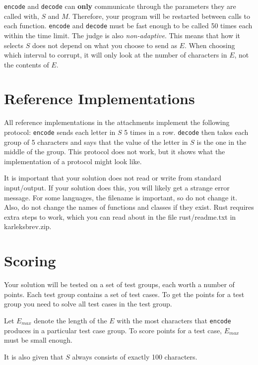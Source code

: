 \texttt{encode} and \texttt{decode} can \textbf{only} communicate through the parameters they are called with, 
$S$ and $M$. Therefore, your program will be restarted between calls to each function. 
\texttt{encode} and \texttt{decode} must be fast enough to be called 50 times each within the time limit. 
The judge is also \textit{non-adaptive}. This means that how it selects $S$ 
does not depend on what you choose to send as $E$. When choosing which interval to corrupt, it will only
look at the number of characters in $E$, not the contents of $E$.

\section*{Reference Implementations}
All reference implementations in the attachments implement the following protocol: \texttt{encode} sends each 
letter in $S$ 5 times in a row. \texttt{decode} then takes each group of 5 characters and says that the value 
of the letter in $S$ is the one in the middle of the group. This protocol does not work, but it shows what the implementation 
of a protocol might look like.

It is important that your solution does not read or write from standard input/output. If your solution does this, 
you will likely get a strange error message. For some languages, the filename is important, so do not change it. Also, 
do not change the names of functions and classes if they exist. Rust requires extra steps to work, which you can read about 
in the file rust/readme.txt in karleksbrev.zip.

\section*{Scoring}
Your solution will be tested on a set of test groups, each worth a number of points. Each test group contains
a set of test cases. To get the points for a test group you need to solve all test cases in the test group.

Let $E_{max}$ denote the length of the $E$ with the most characters that \texttt{encode} produces in a 
particular test case group. To score points for a test case, $E_{max}$ must be small enough.

It is also given that $S$ always consists of exactly 100 characters.

